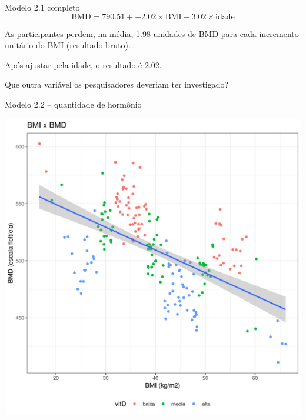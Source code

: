 \documentclass{beamer}
\begin{document}
\begin{frame}{\scriptsize }
  \begin{exampleblock}{Modelo 2.1 completo}
    \footnotesize
    \begin{displaymath}
      \text{BMD} =790.51 + -2.02 \times\text{BMI} -3.02 \times\text{idade}
    \end{displaymath}
  \end{exampleblock}
  \begin{block}{}
    \footnotesize
    As participantes perdem, na média, 1.98 unidades de BMD para cada incremento unitário do BMI (resultado bruto).

    \bigskip
    Após ajustar pela idade, o resultado é 2.02.
  \end{block}
\end{frame}

\begin{frame}{\scriptsize }
  \begin{center}
    Que outra variável os pesquisadores deveriam ter investigado?
  \end{center}
\end{frame}

\begin{frame}{\scriptsize Modelo 2.2 -- quantidade de hormônio}
  \begin{center}
    \includegraphics[height=.9\textheight]{Cap31-32/pratica-rlm2_2}
  \end{center}
\end{frame}
\end{document}
